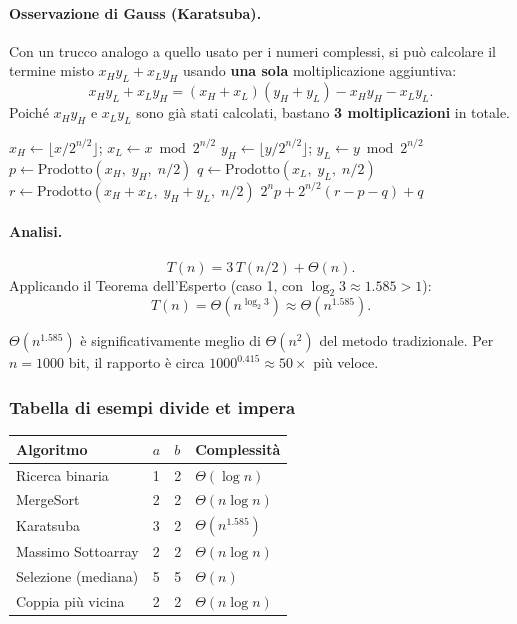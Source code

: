 \paragraph{Osservazione di Gauss (Karatsuba).}
Con un trucco analogo a quello usato per i numeri complessi,
si può calcolare il termine misto $x_H y_L + x_L y_H$
usando \textbf{una sola} moltiplicazione aggiuntiva:
\[
x_H y_L + x_L y_H
= (x_H + x_L)(y_H + y_L) - x_H y_H - x_L y_L.
\]
Poiché $x_H y_H$ e $x_L y_L$ sono già stati calcolati, bastano
\textbf{3 moltiplicazioni} in totale.

\begin{algorithm}[H]
	\caption{Prodotto$(x, y, n)$}
	$x_H \gets \lfloor x / 2^{n/2} \rfloor$;\quad
	$x_L \gets x \bmod 2^{n/2}$\;
	$y_H \gets \lfloor y / 2^{n/2} \rfloor$;\quad
	$y_L \gets y \bmod 2^{n/2}$\;
	$p \gets \text{Prodotto}(x_H,\; y_H,\; n/2)$\;
	$q \gets \text{Prodotto}(x_L,\; y_L,\; n/2)$\;
	$r \gets \text{Prodotto}(x_H + x_L,\; y_H + y_L,\; n/2)$\;
	\Return $2^n p + 2^{n/2}(r - p - q) + q$\;
\end{algorithm}

\paragraph{Analisi.}
\[
T(n) = 3\,T(n/2) + \Theta(n).
\]
Applicando il Teorema dell'Esperto (caso 1, con
$\log_2 3 \approx 1.585 > 1$):
\[
\boxed{T(n) = \Theta(n^{\log_2 3}) \approx \Theta(n^{1.585})}.
\]

\begin{nota}
	$\Theta(n^{1.585})$ è significativamente meglio di $\Theta(n^2)$
	del metodo tradizionale. Per $n = 1000$ bit, il rapporto è circa
	$1000^{0.415} \approx 50\times$ più veloce.
\end{nota}

\subsubsection{Tabella di esempi divide et impera}

\begin{center}
	\begin{tabular}{llll}
		\toprule
		\textbf{Algoritmo} & $a$ & $b$ & \textbf{Complessità} \\
		\midrule
		Ricerca binaria    & 1 & 2 & $\Theta(\log n)$ \\
		MergeSort          & 2 & 2 & $\Theta(n \log n)$ \\
		Karatsuba          & 3 & 2 & $\Theta(n^{1.585})$ \\
		Massimo Sottoarray & 2 & 2 & $\Theta(n \log n)$ \\
		Selezione (mediana)& 5 & 5 & $\Theta(n)$ \\
		Coppia più vicina  & 2 & 2 & $\Theta(n \log n)$ \\
		\bottomrule
	\end{tabular}
\end{center}
